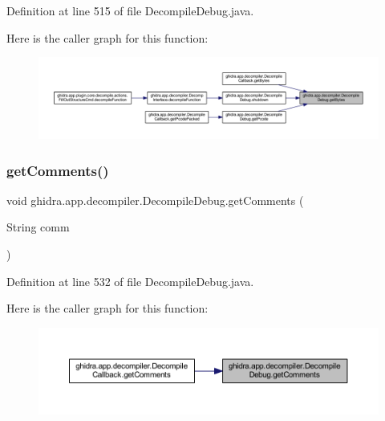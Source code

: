 Definition at line 515 of file Decompile\+Debug.\+java.

Here is the caller graph for this function\+:
\nopagebreak
\begin{figure}[H]
\begin{center}
\leavevmode
\includegraphics[width=350pt]{classghidra_1_1app_1_1decompiler_1_1_decompile_debug_abbbb57329ae69cd3bf3dee407fa190e9_icgraph}
\end{center}
\end{figure}
\mbox{\label{classghidra_1_1app_1_1decompiler_1_1_decompile_debug_a5ac171ab08ec9d831e20fb532208c1f4}} 
\subsubsection{\texorpdfstring{getComments()}{getComments()}}
{\footnotesize\ttfamily void ghidra.\+app.\+decompiler.\+Decompile\+Debug.\+get\+Comments (\begin{DoxyParamCaption}\item[{String}]{comm }\end{DoxyParamCaption})\hspace{0.3cm}{\ttfamily [inline]}}



Definition at line 532 of file Decompile\+Debug.\+java.

Here is the caller graph for this function\+:
\nopagebreak
\begin{figure}[H]
\begin{center}
\leavevmode
\includegraphics[width=350pt]{classghidra_1_1app_1_1decompiler_1_1_decompile_debug_a5ac171ab08ec9d831e20fb532208c1f4_icgraph}
\end{center}
\end{figure}
\mbox{\label{classghidra_1_1app_1_1decompiler_1_1_decompile_debug_ad15cca2c42d67c2c541cf17619cef018}} 
